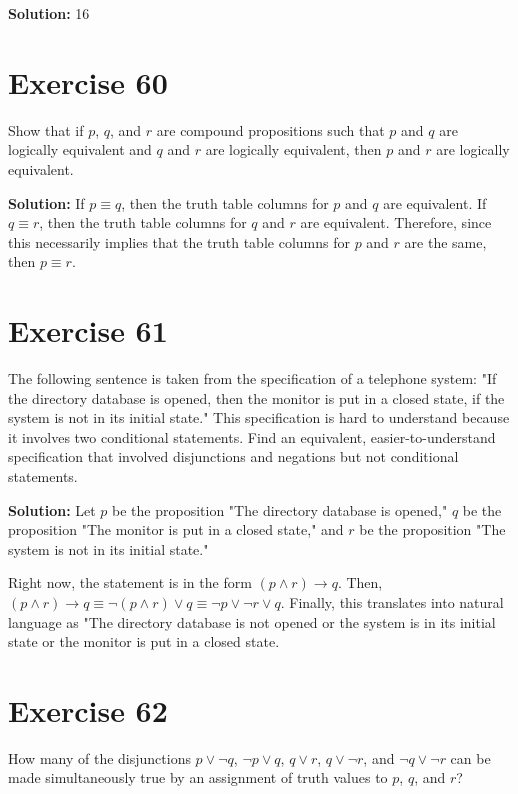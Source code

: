 \documentclass{Axon}
\begin{document}
\noindent
\textbf{Solution:}
16

\section*{Exercise 60}
Show that if \(p\), \(q\), and \(r\) are compound propositions such that \(p\) and \(q\) are logically equivalent and \(q\) and \(r\) are logically equivalent, then \(p\) and \(r\) are logically equivalent.

\noindent
\textbf{Solution:}
If \(p \equiv q\), then the truth table columns for \(p\) and \(q\) are equivalent. If \(q \equiv r\), then the truth table columns for \(q\) and \(r\) are equivalent. Therefore, since this necessarily implies that the truth table columns for \(p\) and \(r\) are the same, then \(p \equiv r\).

\section*{Exercise 61}
The following sentence is taken from the specification of a telephone system: "If the directory database is opened, then the monitor is put in a closed state, if the system is not in its initial state." This specification is hard to understand because it involves two conditional statements. Find an equivalent, easier-to-understand specification that involved disjunctions and negations but not conditional statements.

\noindent
\textbf{Solution:}
Let \(p\) be the proposition "The directory database is opened," \(q\) be the proposition "The monitor is put in a closed state," and \(r\) be the proposition "The system is not in its initial state."

Right now, the statement is in the form \(\left(p \land r\right) \to q\). Then, \(\left(p \land r\right) \to q \equiv \lnot\left(p \land r\right) \lor q \equiv \lnot p \lor \lnot r \lor q\). Finally, this translates into natural language as "The directory database is not opened or the system is in its initial state or the monitor is put in a closed state.

\section*{Exercise 62}
How many of the disjunctions \(p \lor \lnot q\), \(\lnot p \lor q\), \(q \lor r\), \(q \lor \lnot r\), and \(\lnot q \lor \lnot r\) can be made simultaneously true by an assignment of truth values to \(p\), \(q\), and \(r\)?
\end{document}
